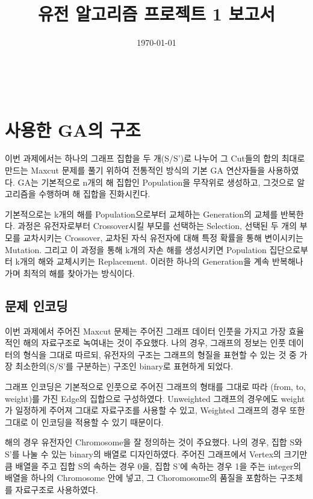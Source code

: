 \documentclass{article}
\begin{document}
\title{ 유전 알고리즘 프로젝트 1 보고서 }
\author{ }
\date{\today}
\maketitle


{~~}


\section{ 사용한 GA의 구조 }

이번 과제에서는 하나의 그래프 집합을 두 개(S/S')로 나누어 그 Cut들의 합의 최대로 만드는 Maxcut 문제를 풀기 위하여 전통적인 방식의 기본 GA 연산자들을 사용하였다. GA는 기본적으로 n개의 해 집합인 Population을 무작위로 생성하고, 그것으로 알고리즘을 수행하며 해 집합을 진화시킨다.

기본적으로는 k개의 해를 Population으로부터 교체하는 Generation의 교체를 반복한다. 과정은 유전자로부터 Crossover시킬 부모를 선택하는 Selection, 선택된 두 개의 부모를 교차시키는 Crossover, 교차된 자식 유전자에 대해 특정 확률을 통해 변이시키는 Mutation. 그리고 이 과정을 통해 k개의 자손 해를 생성시키면 Population 집단으로부터 k개의 해와 교체시키는 Replacement. 이러한 하나의 Generation을 계속 반복해나가며 최적의 해를 찾아가는 방식이다.


\subsection{ 문제 인코딩 }

이번 과제에서 주어진 Maxcut 문제는 주어진 그래프 데이터 인풋을 가지고 가장 효율적인 해의 자료구조로 녹여내는 것이 주요했다. 나의 경우, 그래프의 정보는 인풋 데이터의 형식을 그대로 따르되, 유전자의 구조는 그래프의 형질을 표현할 수 있는 것 중 가장 최소한의(S/S'를 구분하는) 구조인 binary로 표현하게 되었다.

그래프 인코딩은 기본적으로 인풋으로 주어진 그래프의 형태를 그대로 따라 (from, to, weight)를 가진 Edge의 집합으로 구성하였다. Unweighted 그래프의 경우에도 weight가 일정하게 주어져 그대로 자료구조를 사용할 수 있고, Weighted 그래프의 경우 또한 그대로 이 인코딩을 적용할 수 있기 때문이다.

해의 경우 유전자인 Chromosome을 잘 정의하는 것이 주요했다. 나의 경우, 집합 S와 S'를 나눌 수 있는 binary의 배열로 디자인하였다. 주어진 그래프에서 Vertex의 크기만큼 배열을 주고 집합 S의 속하는 경우 0을, 집합 S'에 속하는 경우 1을 주는 integer의 배열을 하나의 Chromosome 안에 넣고, 그 Choromosome의 품질을 포함하는 구조체를 자료구조로 사용하였다.
\end{document}
